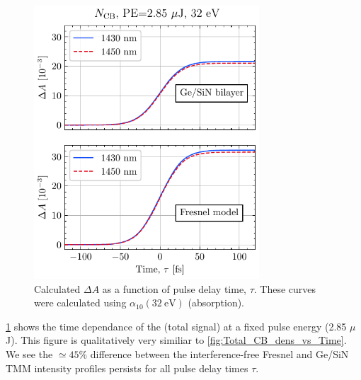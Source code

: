 \begin{figure}
	\centering
	\includegraphics[width=0.75\textwidth]{figures/chap4/FVA_Total_CB_dens_vs_T.pdf}
	\caption{Calculated $\Delta A$ as a function of pulse delay time, $\tau$. These curves were calculated using $\alpha_{10}(32 \ \textrm{eV})$ (absorption).}
	\label{fig:FVA_Total_CB_dens_vs_T}
\end{figure}

\cref{fig:FVA_Total_CB_dens_vs_T} shows the time dependance of the (total signal) at a fixed pulse energy (2.85 $\mu$J). This figure is qualitatively very similiar to \cref{fig:Total_CB_dens_vs_Time}. We see the $\simeq 45\%$ difference between the interference-free Fresnel and Ge/SiN TMM intensity profiles persists for all pulse delay times $\tau$.

